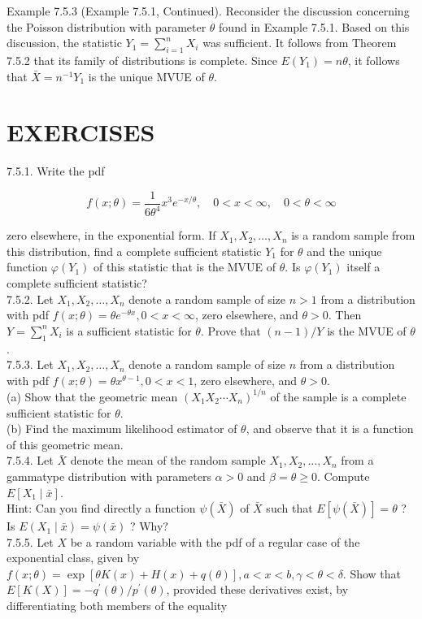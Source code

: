 Example 7.5.3 (Example 7.5.1, Continued). Reconsider the discussion concerning the Poisson distribution with parameter $\theta$ found in Example 7.5.1. Based on this discussion, the statistic $Y_{1}=\sum_{i=1}^{n} X_{i}$ was sufficient. It follows from Theorem 7.5.2 that its family of distributions is complete. Since $E\left(Y_{1}\right)=n \theta$, it follows that $\bar{X}=n^{-1} Y_{1}$ is the unique MVUE of $\theta$.

\section*{EXERCISES}
7.5.1. Write the pdf

$$
f(x ; \theta)=\frac{1}{6 \theta^{4}} x^{3} e^{-x / \theta}, \quad 0<x<\infty, \quad 0<\theta<\infty
$$

zero elsewhere, in the exponential form. If $X_{1}, X_{2}, \ldots, X_{n}$ is a random sample from this distribution, find a complete sufficient statistic $Y_{1}$ for $\theta$ and the unique function $\varphi\left(Y_{1}\right)$ of this statistic that is the MVUE of $\theta$. Is $\varphi\left(Y_{1}\right)$ itself a complete sufficient statistic?\\
7.5.2. Let $X_{1}, X_{2}, \ldots, X_{n}$ denote a random sample of size $n>1$ from a distribution with pdf $f(x ; \theta)=\theta e^{-\theta x}, 0<x<\infty$, zero elsewhere, and $\theta>0$. Then $Y=\sum_{1}^{n} X_{i}$ is a sufficient statistic for $\theta$. Prove that $(n-1) / Y$ is the MVUE of $\theta$.\\
7.5.3. Let $X_{1}, X_{2}, \ldots, X_{n}$ denote a random sample of size $n$ from a distribution with pdf $f(x ; \theta)=\theta x^{\theta-1}, 0<x<1$, zero elsewhere, and $\theta>0$.\\
(a) Show that the geometric mean $\left(X_{1} X_{2} \cdots X_{n}\right)^{1 / n}$ of the sample is a complete sufficient statistic for $\theta$.\\
(b) Find the maximum likelihood estimator of $\theta$, and observe that it is a function of this geometric mean.\\
7.5.4. Let $\bar{X}$ denote the mean of the random sample $X_{1}, X_{2}, \ldots, X_{n}$ from a gammatype distribution with parameters $\alpha>0$ and $\beta=\theta \geq 0$. Compute $E\left[X_{1} \mid \bar{x}\right]$.\\
Hint: Can you find directly a function $\psi(\bar{X})$ of $\bar{X}$ such that $E[\psi(\bar{X})]=\theta$ ? Is $E\left(X_{1} \mid \bar{x}\right)=\psi(\bar{x})$ ? Why?\\
7.5.5. Let $X$ be a random variable with the pdf of a regular case of the exponential class, given by $f(x ; \theta)=\exp [\theta K(x)+H(x)+q(\theta)], a<x<b, \gamma<\theta<\delta$. Show that $E[K(X)]=-q^{\prime}(\theta) / p^{\prime}(\theta)$, provided these derivatives exist, by differentiating both members of the equality

